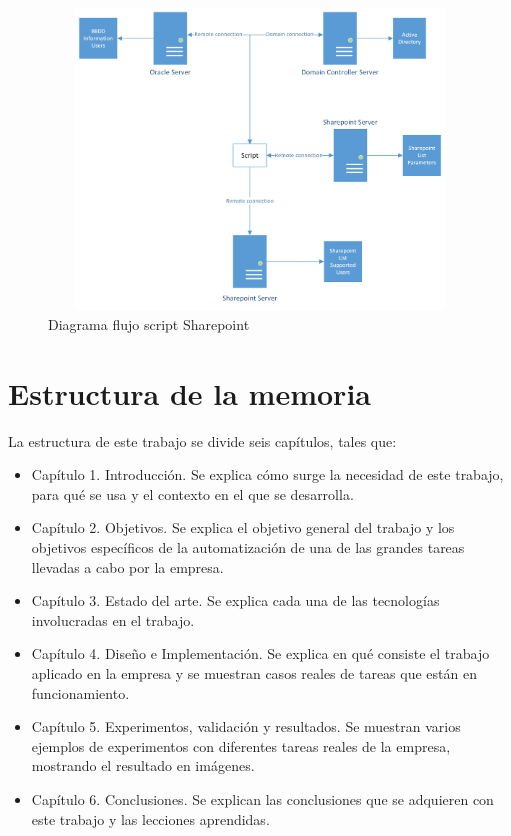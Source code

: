 \documentclass[a4paper, 12pt]{book}
\begin{document}
\begin{figure}[H]
	\centering
	\includegraphics[width=15cm, height=8cm, keepaspectratio]{img/Sharepoint_diagrama.png}
	\caption{Diagrama flujo script Sharepoint}
	\label{fig:Sharepoint_diagrama}
\end{figure}

\section{Estructura de la memoria}
\label{sec:estructura}

La estructura de este trabajo se divide seis capítulos, tales que:

\begin{itemize}
\item Capítulo 1. Introducción.
Se explica cómo surge la necesidad de este trabajo, para qué se usa y el contexto en el que se desarrolla.

\item Capítulo 2. Objetivos.
Se explica el objetivo general del trabajo y los objetivos específicos de la automatización de una de las grandes tareas llevadas a cabo por la empresa.

\item Capítulo 3. Estado del arte.
Se explica cada una de las tecnologías involucradas en el trabajo.

\item Capítulo 4. Diseño e Implementación.
Se explica en qué consiste el trabajo aplicado en la empresa y se muestran casos reales de tareas que están en funcionamiento.

\item Capítulo 5. Experimentos, validación y resultados.
Se muestran varios ejemplos de experimentos con diferentes tareas reales de la empresa, mostrando el resultado en imágenes.

\item Capítulo 6. Conclusiones.
Se explican las conclusiones que se adquieren con este trabajo y las lecciones aprendidas.

\end{itemize}
\end{document}
